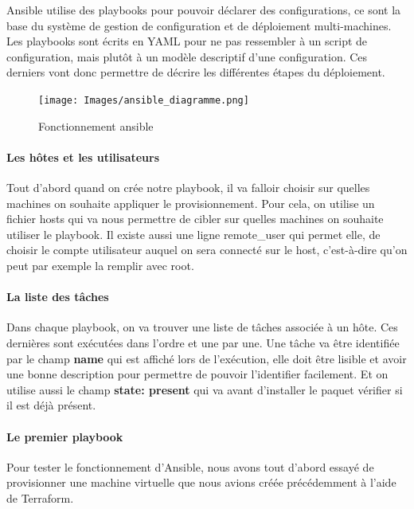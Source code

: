 \documentclass[]{article}
\let\oldparagraph\paragraph
\renewcommand{\paragraph}[1]{\oldparagraph{#1}\mbox{}}
\begin{document}
Ansible utilise des playbooks pour pouvoir déclarer des configurations,
ce sont la base du système de gestion de configuration et de déploiement
multi-machines. Les playbooks sont écrits en YAML pour ne pas ressembler
à un script de configuration, mais plutôt à un modèle descriptif d'une
configuration. Ces derniers vont donc permettre de décrire les différentes étapes du déploiement.

\begin{figure}
\centering
\texttt{[image: Images/ansible\_diagramme.png]}
\caption{Fonctionnement ansible}
\end{figure}


\paragraph{Les hôtes et les utilisateurs}\label{les-huxf4tes-et-les-utilisateurs}

Tout d'abord quand on crée notre playbook, il va falloir choisir sur
quelles machines on souhaite appliquer le provisionnement. Pour cela, on
utilise un fichier hosts qui va nous permettre de cibler sur quelles
machines on souhaite utiliser le playbook. Il existe aussi une ligne
remote\_user qui permet elle, de choisir le compte utilisateur auquel
on sera connecté sur le host, c'est-à-dire qu'on peut par exemple la
remplir avec root.

\paragraph{La liste des tâches}\label{la-liste-des-tuxe2ches}

Dans chaque playbook, on va trouver une liste de tâches associée à un
hôte. Ces dernières sont exécutées dans l'ordre et une par une. Une
tâche va être identifiée par le champ \textbf{name} qui est affiché lors de
l'exécution, elle doit être lisible et avoir une bonne description pour
permettre de pouvoir l'identifier facilement.
Et on utilise aussi le champ \textbf{state: present} qui va avant d'installer le paquet vérifier si il est déjà présent.

\paragraph{Le premier playbook}\label{le-premier-playbook}

Pour tester le fonctionnement d'Ansible, nous avons tout d'abord essayé
de provisionner une machine virtuelle que nous avions créée précédemment
à l'aide de Terraform. 
\end{document}
